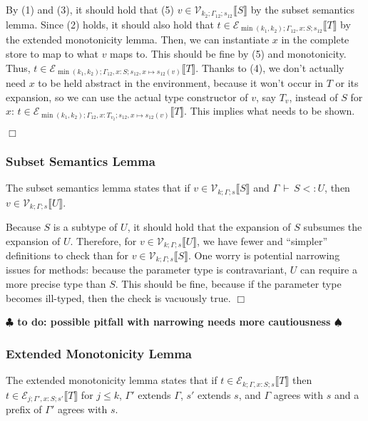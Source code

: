 \documentclass[9pt]{sigplanconf}
\newenvironment{proofsketch}{{\em Proof Sketch:}}{$\Box$}
\newcommand{\ts}{\,\vdash\,}
\newcommand{\remark}[1]{{\bf $\clubsuit$ #1 $\spadesuit$}}
\newcommand{\todo}[1]{\remark{to do: #1}}
\newcommand{\envplus}[1]{, #1}
\newcommand{\relv}[4]{\mathcal{V}_{#1;#2;#3}\llbracket#4\rrbracket}
\newcommand{\rele}[4]{\mathcal{E}_{#1;#2;#3}\llbracket#4\rrbracket}
\begin{document}
\begin{proofsketch}
By (1) and (3), it should hold that (5) $v \in \relv {k_2}
{\Gamma_{12}} {s_{12}} {S}$ by the subset semantics lemma.  Since (2)
holds, it should also hold that ${t} \in \rele {\min(k_1,k_2)}
{\Gamma_{12} \envplus{{x} : S}} {s_{12}} T$ by the extended
monotonicity lemma. Then, we can instantiate $x$ in the complete store
to map to what $v$ maps to. This should be fine by (5) and
monotonicity. Thus, ${t} \in \rele {\min(k_1,k_2)} {\Gamma_{12}
  \envplus{{x} : S}} {s_{12} \envplus{{x} \mapsto s_{12}(v)}}
T$. Thanks to (4), we don't actually need $x$ to be held abstract in
the environment, because it won't occur in $T$ or its expansion, so we
can use the actual type constructor of $v$, say $T_{v}$, instead of
$S$ for $x$: ${t} \in \rele {\min(k_1,k_2)} {\Gamma_{12} \envplus{{x}
    : {T_{v_2}}}} {s_{12} \envplus{{x} \mapsto s_{12}(v)}} T$. This
implies what needs to be shown.

\end{proofsketch}

\subsubsection{Subset Semantics Lemma}

The subset semantics lemma states that if $v \in \relv k \Gamma s S$
and $\Gamma \ts S <: U$, then $v \in \relv k \Gamma s U$.

\begin{proofsketch}
Because $S$ is a subtype of $U$, it should hold that the expansion of
$S$ subsumes the expansion of $U$. Therefore, for $v \in \relv k
\Gamma s U$, we have fewer and ``simpler'' definitions to check than
for $v \in \relv k \Gamma s S$. One worry is potential narrowing
issues for methods: because the parameter type is contravariant, $U$
can require a more precise type than $S$. This should be fine, because
if the parameter type becomes ill-typed, then the check is vacuously
true.
\end{proofsketch}

\todo{possible pitfall with narrowing needs more cautiousness}

\subsubsection{Extended Monotonicity Lemma}

The extended monotonicity lemma states that if $t \in \rele k {\Gamma
  \envplus{x : S}} s T$ then $t \in \rele j {\Gamma' \envplus{x : S}}
{s'} T$ for $j \leq k$, $\Gamma'$ extends $\Gamma$, $s'$
extends $s$, and $\Gamma$ agrees with $s$ and a prefix of $\Gamma'$
agrees with $s$.
\end{document}
